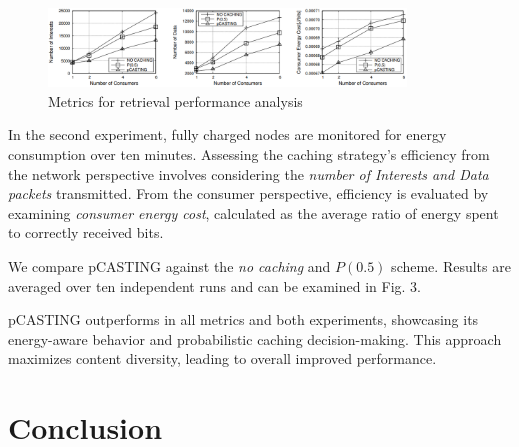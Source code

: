 \documentclass[conference]{IEEEtran}
\begin{document}
\begin{figure}[htbp]
    \centerline{\includegraphics[width=9.5cm]{fig3.png}}
    \caption{Metrics for retrieval performance analysis}
    \label{fig3}
\end{figure}

In the second experiment, fully charged nodes are monitored for energy consumption over ten minutes. Assessing the caching 
strategy's efficiency from the network perspective involves considering the \textit{number of Interests and Data packets} transmitted. 
From the consumer perspective, efficiency is evaluated by examining \textit{consumer energy cost}, calculated as the average ratio of 
energy spent to correctly received bits.

We compare pCASTING against the \textit{no caching} and $P(0.5)$ scheme. Results are averaged over ten independent runs
and can be examined in Fig. 3.



pCASTING outperforms in all metrics and both experiments, showcasing its energy-aware behavior and probabilistic 
caching decision-making. This approach maximizes content diversity, leading to overall improved performance.


\section{Conclusion}
\end{document}

